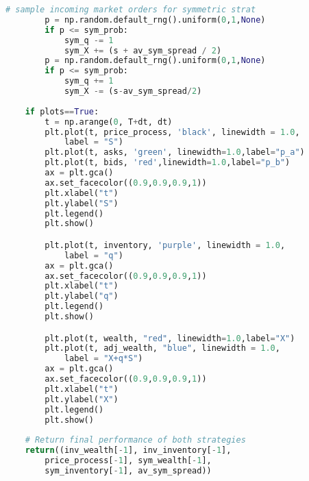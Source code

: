\begin{lstlisting}[language=Python, caption=Avellaneda-Stoikov Model]
        # sample incoming market orders for symmetric strat
        p = np.random.default_rng().uniform(0,1,None)
        if p <= sym_prob:
            sym_q -= 1
            sym_X += (s + av_sym_spread / 2)
        p = np.random.default_rng().uniform(0,1,None)
        if p <= sym_prob:
            sym_q += 1
            sym_X -= (s-av_sym_spread/2)
    
    if plots==True:
        t = np.arange(0, T+dt, dt)
        plt.plot(t, price_process, 'black', linewidth = 1.0, 
            label = "S")
        plt.plot(t, asks, 'green', linewidth=1.0,label="p_a")
        plt.plot(t, bids, 'red',linewidth=1.0,label="p_b")
        ax = plt.gca()
        ax.set_facecolor((0.9,0.9,0.9,1))
        plt.xlabel("t")
        plt.ylabel("S")
        plt.legend()
        plt.show()

        plt.plot(t, inventory, 'purple', linewidth = 1.0, 
            label = "q")
        ax = plt.gca()
        ax.set_facecolor((0.9,0.9,0.9,1))
        plt.xlabel("t")
        plt.ylabel("q")
        plt.legend()
        plt.show()

        plt.plot(t, wealth, "red", linewidth=1.0,label="X")
        plt.plot(t, adj_wealth, "blue", linewidth = 1.0, 
            label = "X+q*S")
        ax = plt.gca()
        ax.set_facecolor((0.9,0.9,0.9,1))
        plt.xlabel("t")
        plt.ylabel("X")
        plt.legend()
        plt.show()
    
    # Return final performance of both strategies
    return((inv_wealth[-1], inv_inventory[-1], 
        price_process[-1], sym_wealth[-1], 
        sym_inventory[-1], av_sym_spread))
\end{lstlisting}

